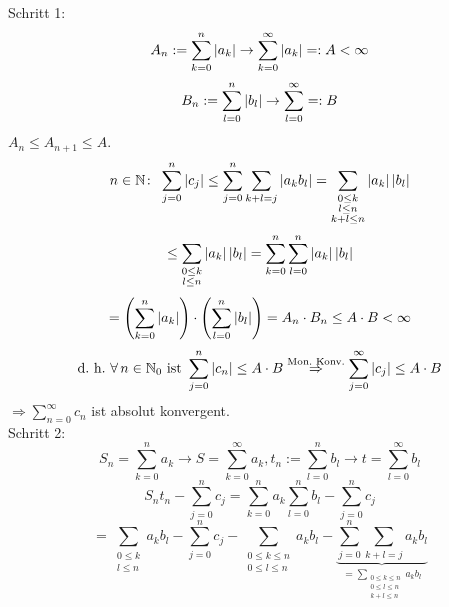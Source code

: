 \documentclass[../ana1.tex]{subfiles}
\begin{document}
\begin{prosa}
    \begin{center}
    \end{center}
\end{prosa}
\begin{bew}
    Schritt 1: 
    \[ A_n := \sum_{k=0}^n \left|a_k\right| \rightarrow \sum_{k=0}^\infty \left|a_k\right| =: A < \infty \]
    \[ B_n := \sum_{l=0}^n \left|b_l\right| \rightarrow \sum_{l=0}^\infty =: B \]
    \( A_n \leq A_{n+1} \leq A \).
    \[ n\in\mathbb{N} \colon \; \sum_{j=0}^n \left|c_j\right| \leq \sum_{j=0}^n \sum_{k+l=j} \left|a_k b_l\right| = \sum_{\substack{0\leq k \\ l\leq n \\ k+l\leq n}} \left|a_k\right|\left|b_l\right| \]
    \[ \leq \sum_{\substack{0\leq k \\ l\leq n}} \left|a_k\right| \left|b_l\right| = \sum_{k=0}^n \sum_{l=0}^n \left|a_k\right| \left|b_l\right| \]
    \[ = \left( \sum_{k=0}^n \left|a_k\right| \right) \cdot \left( \sum_{l=0}^n \left|b_l\right| \right) = A_n \cdot B_n \leq A \cdot B < \infty \]
    \[ \text{d.\ h.\ } \forall \, n\in\N_0 \text{ ist } \sum_{j=0}^n \abs{c_n} \leq A \cdot B \overset{\text{Mon.\ Konv.}}{\Rightarrow} \sum_{j=0}^\infty \abs{c_j} \leq A \cdot B \]
    \( \Rightarrow \sum_{n=0}^\infty c_n \) ist absolut konvergent. \\
    Schritt 2:
    \[ S_n = \sum_{k=0}^n a_k \rightarrow S = \sum_{k=0}^\infty a_k, t_n := \sum_{l=0}^n b_l \rightarrow t = \sum_{l=0}^\infty b_l \]
    \[ S_n t_n - \sum_{j=0}^n c_j = \sum_{k=0}^n a_k \sum_{l=0}^n b_l - \sum_{j=0}^n c_j \]
    \[ = \sum_{\substack{0\leq k \\ l\leq n}} a_k b_l - \sum_{j=0}^n c_j - \sum_{\substack{0\leq k \leq n \\ 0\leq l \leq n}} a_k b_l - \underbrace{\sum_{j=0}^n \sum_{k+l=j} a_k b_l}_{=\sum_{\substack{0\leq k \leq n \\ 0\leq l \leq n \\ k+l\leq n}} a_k b_l} \]

\end{bew}
\end{document}
